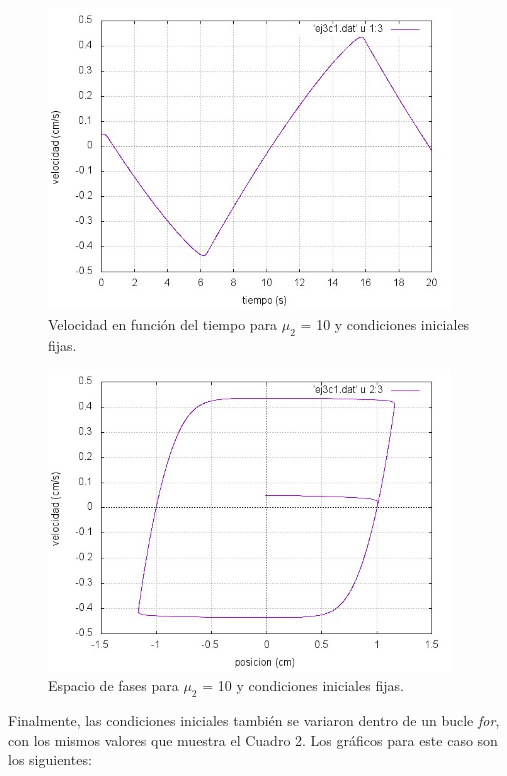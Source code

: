 \documentclass[a4paper,12pt]{article}
\begin{document}
\begin{itemize}
\begin{figure}[H]
\begin{center}
\includegraphics[height=8cm]{grafico_ej3c1_vVSt.jpg}
\caption[width=5cm]{Velocidad en funci\'on del tiempo para $\mu_2$ = 10 y condiciones iniciales fijas.}
\end{center}
\end{figure}

\begin{figure}[H]
\begin{center}
\includegraphics[height=8cm]{grafico_ej3c1_xVSv.jpg}
\caption[width=5cm]{Espacio de fases para $\mu_2$ = 10 y condiciones iniciales fijas.}
\end{center}
\end{figure}



Finalmente, las condiciones iniciales tambi\'en se variaron dentro de un bucle \textit{for}, con los mismos valores que muestra el Cuadro 2. Los gr\'aficos para este caso son los siguientes:


\end{itemize}
\end{document}
